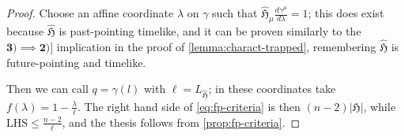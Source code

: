 	\begin{proof}
		Choose an affine coordinate \(\lambda\) on \(\gamma\) such that \(\hat{\mathfrak{H}}_{\mu}\frac{d\gamma^{\mu}}{d\lambda} = 1\); this does exist because \(\hat{\mathfrak{H}}\) is past-pointing timelike, and it can be proven similarly to the \(\mathbf{3) \implies 2)]}\) implication in the proof of \ref{lemma:charact-trapped}, remembering \(\hat{\mathfrak{H}}\) is future-pointing and timelike.
		
		Then we can call \(q = \gamma(l)\) with \(\ell = L_{\hat{\mathfrak{H}}}\); in these coordinates take \(f(\lambda) = 1 - \frac{\lambda}{\ell}\). The right hand side of \eqref{eq:fp-criteria} is then \((n-2)|\mathfrak{H}|\), while \(\text{LHS} \le \frac{n - 2}{\ell}\), and the thesis follows from \ref{prop:fp-criteria}.
	\end{proof}
	
	
	



